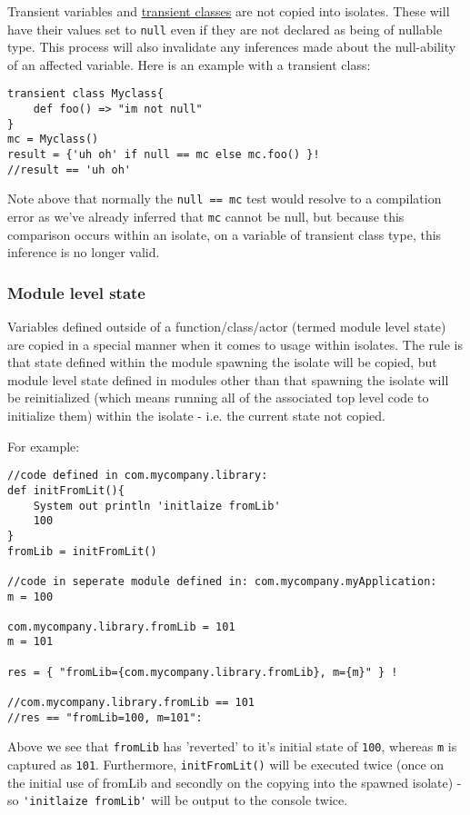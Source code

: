 \documentclass[conc-doc]{subfiles}
\begin{document}
Transient variables and \hyperref[sec:transientClasses]{transient classes} are not copied into isolates. These will have their values set to \lstinline{null} even if they are not declared as being of nullable type. This process will also invalidate any inferences made about the null-ability of an affected variable. Here is an example with a transient class:

\begin{lstlisting}
transient class Myclass{
	def foo() => "im not null"
}
mc = Myclass()
result = {'uh oh' if null == mc else mc.foo() }!
//result == 'uh oh'
\end{lstlisting}

Note above that normally the \lstinline{null == mc} test would resolve to a compilation error as we've already inferred that \lstinline{mc} cannot be null, but because this comparison occurs within an isolate, on a variable of transient class type, this inference is no longer valid.

\subsubsection{Module level state}
Variables defined outside of a function/class/actor (termed module level state) are copied in a special manner when it comes to usage within isolates. The rule is that state defined within the module spawning the isolate will be copied, but module level state defined in modules other than that spawning the isolate will be reinitialized (which means running all of the associated top level code to initialize them) within the isolate - i.e. the current state not copied.

For example:

\begin{lstlisting}
//code defined in com.mycompany.library:
def initFromLit(){
	System out println 'initlaize fromLib'
	100
}
fromLib = initFromLit()

//code in seperate module defined in: com.mycompany.myApplication:
m = 100

com.mycompany.library.fromLib = 101
m = 101

res = { "fromLib={com.mycompany.library.fromLib}, m={m}" } !

//com.mycompany.library.fromLib == 101
//res == "fromLib=100, m=101":
\end{lstlisting}

Above we see that \lstinline{fromLib} has 'reverted' to it's initial state of \lstinline{100}, whereas \lstinline{m} is captured as \lstinline{101}. Furthermore, \lstinline{initFromLit()} will be executed twice (once on the initial use of fromLib and secondly on the copying into the spawned isolate) - so \lstinline{'initlaize fromLib'} will be output to the console twice.
\end{document}
